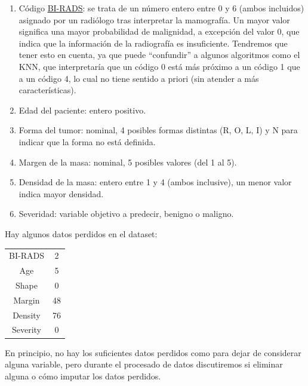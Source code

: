 \documentclass{article}
\begin{document}
\begin{enumerate}
\item Código \href{https://es.wikipedia.org/wiki/BI-RADS}{BI-RADS}: se
  trata de un número entero entre 0 y 6 (ambos incluidos) asignado por
  un radiólogo tras interpretar la mamografía. Un mayor valor
  significa una mayor probabilidad de malignidad, a excepción del
  valor 0, que indica que la información de la radiografía es
  insuficiente. Tendremos que tener esto en cuenta, ya que puede
  ``confundir'' a algunos algoritmos como el KNN, que interpretaría
  que un código 0 está más próximo a un código 1 que a un código 4, lo
  cual no tiene sentido a priori (sin atender a más características).

\item Edad del paciente: entero positivo.
\item Forma del tumor: nominal, 4 posibles formas distintas (R, O, L,
  I) y N para indicar que la forma no está definida.
\item Margen de la masa: nominal, 5 posibles valores (del 1 al 5).
\item Densidad de la masa: entero entre 1 y 4 (ambos inclusive), un
  menor valor indica mayor densidad.
\item Severidad: variable objetivo a predecir, benigno o maligno. 
\end{enumerate}

Hay algunos datos perdidos en el dataset: \vspace{-5mm}
\begin{table}[H]
  \centering
  \begin{tabular}{c|c}
    BI-RADS     & 2 \\
    Age         & 5 \\
    Shape       & 0 \\
    Margin      & 48 \\
    Density     & 76 \\
    Severity    & 0
  \end{tabular}
\end{table}
\vspace{-8mm} En principio, no hay los suficientes datos perdidos como
para dejar de considerar alguna variable, pero durante el procesado de
datos discutiremos si eliminar alguna o cómo imputar los datos
perdidos.
\end{document}
